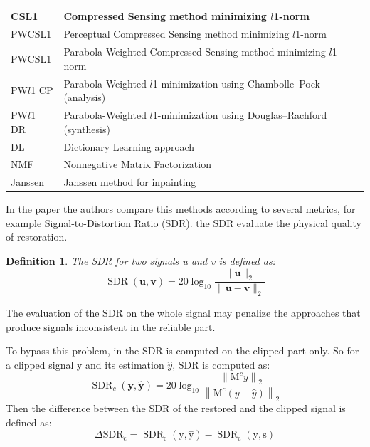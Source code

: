 \documentclass{article}
\numberwithin{dummy}{section}
\newtheorem{definitionT}{Definition}[section]
\newenvironment{definition}{\begin{dBox}\begin{definitionT}}{\end{definitionT}\end{dBox}}
\begin{document}
\begin{table}[ht!]
\begin{tabular}{|l|l|c|}
CSL1        & Compressed Sensing method minimizing ${l}$1-norm                                    &       \cite{6600777}    \\ \hline
\rowcolor{Gray}
PWCSL1      & Perceptual Compressed Sensing method minimizing ${l}$1-norm                         &       \cite{6600777}     \\ \hline
PWCSL1        & Parabola-Weighted Compressed Sensing method minimizing ${l}$1-norm                  &       \cite{záviška2020survey}    \\ \hline
\rowcolor{Gray}
PW${l}$1 CP       & Parabola-Weighted ${l}$1-minimization using Chambolle–Pock (analysis)               &      \cite{záviška2020survey}     \\ \hline
PW${l}$1 DR      & Parabola-Weighted ${l}$1-minimization using Douglas–Rachford (synthesis)            &       \cite{Zaviska_2019}    \\ \hline
\rowcolor{Gray}
DL           & Dictionary Learning approach                                                    &     \cite{10.1007/978-3-319-93764-9_41}      \\ \hline
NMF          & Nonnegative Matrix Factorization                                                &      \cite{7336948}     \\ \hline
\rowcolor{Gray}
Janssen      & Janssen method for inpainting                                                   &    \cite{1164824}       \\ \hline
\end{tabular}
\end{table}

In the paper the authors compare this methods according to several metrics, for example Signal-to-Distortion Ratio (SDR). the SDR evaluate the physical quality of restoration.
\begin{definition}
The SDR for two signals u and v is defined as:$$
\operatorname{SDR}(\mathbf{u}, \mathbf{v})=20 \log _{10} \frac{\|\mathbf{u}\|_{2}}{\|\mathbf{u}-\mathbf{v}\|_{2}}
$$
\end{definition}
\begin{warn}
The evaluation of  the SDR on the whole signal may penalize the
approaches that produce signals inconsistent in the reliable part.
\end{warn}
To bypass this problem, in \cite{gaultier:tel-02148598} the SDR is computed on the clipped part only. So for a clipped signal y and its estimation $\hat{y}$, SDR is computed as:
$$
\operatorname{SDR}_{c}(\mathbf{y}, \hat{\mathbf{y}})=20 \log _{10} \frac{\left\|\mathrm{M}^{c} y\right\|_{2}}{\left\|\mathrm{M}^{c}(y-\hat{y})\right\|_{2}}
$$
Then the difference between the SDR of the restored and the clipped signal is defined as:
$$\Delta \mathrm{SDR}_{\mathrm{c}}=\operatorname{SDR}_{\mathrm{c}}(\mathrm{y}, \hat{\mathrm{y}})-\operatorname{SDR}_{\mathrm{c}}(\mathrm{y}, \mathrm{s})$$
\end{document}
